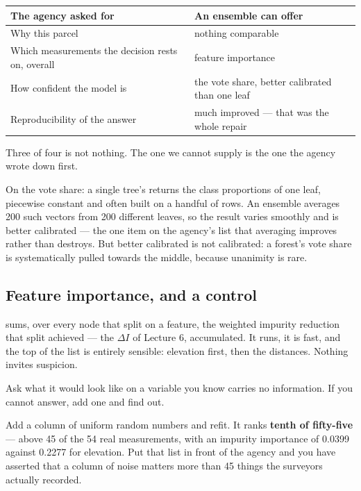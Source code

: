 \documentclass[11pt,a4paper]{article}
\begin{document}
\begin{center}
\small
\begin{tabular}{ll}
\toprule
\textbf{The agency asked for} & \textbf{An ensemble can offer} \\
\midrule
Why this parcel & nothing comparable \\
Which measurements the decision rests on, overall & feature importance \\
How confident the model is & the vote share, better calibrated than one leaf \\
Reproducibility of the answer & much improved --- that was the whole repair \\
\bottomrule
\end{tabular}
\end{center}

Three of four is not nothing. The one we cannot supply is the one the agency
wrote down first.

On the vote share: a single tree's  returns the class
proportions of one leaf, piecewise constant and often built on a handful of
rows. An ensemble averages 200 such vectors from 200 different leaves, so the
result varies smoothly and is better calibrated --- the one item on the
agency's list that averaging improves rather than destroys. But better
calibrated is not calibrated: a forest's vote share is systematically pulled
towards the middle, because unanimity is rare.

\subsection{Feature importance, and a control}

 sums, over every node that split on a feature,
the weighted impurity reduction that split achieved --- the $\Delta I$ of
Lecture 6, accumulated. It runs, it is fast, and the top of the list is
entirely sensible: elevation first, then the distances. Nothing invites
suspicion.

\begin{keybox}[title={Before trusting any ranking}]
Ask what it would look like on a variable you know carries no information. If
you cannot answer, add one and find out.
\end{keybox}

Add a column of uniform random numbers and refit. It ranks \textbf{tenth of
fifty-five} --- above 45 of the 54 real measurements, with an impurity
importance of 0.0399 against 0.2277 for elevation. Put that list in front of
the agency and you have asserted that a column of noise matters more than 45
things the surveyors actually recorded.
\end{document}
